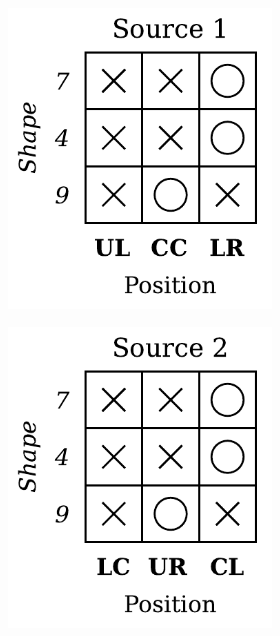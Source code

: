 \begin{definition}
\begin{figure}[H]
\begin{subfigure}[b]{0.45\textwidth}
\begin{subfigure}[b]{0.48\textwidth}
                \includegraphics[width=\textwidth]{img/datasets/3-CGO_fact=pos_env=0.pdf}
            \end{subfigure}
            \begin{subfigure}[b]{0.48\textwidth}
                \centering
                \includegraphics[width=\textwidth]{img/datasets/3-CGO_fact=pos_env=1.pdf}

\end{subfigure}
\end{subfigure}
\end{figure}
\end{definition}

